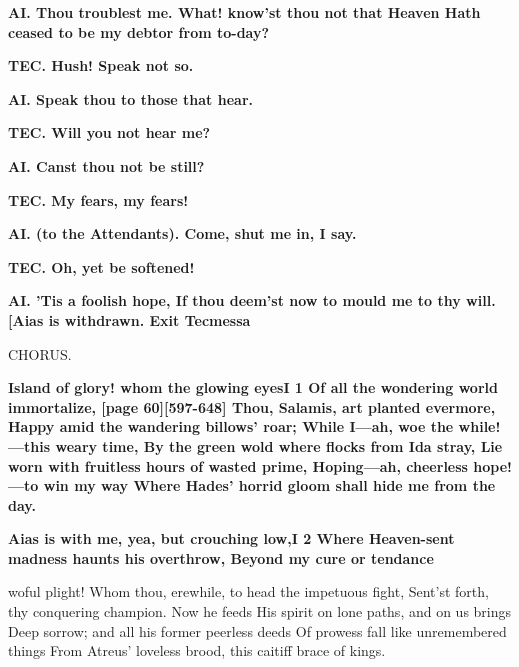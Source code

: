 \documentclass[11pt,letter]{book}
\begin{document}
\par \textbf{AI. Thou troublest me. What! know’st thou not that Heaven Hath ceased to be my debtor from to-day?}
\par 

\par \textbf{TEC. Hush! Speak not so.}
\par 

\par \textbf{AI. Speak thou to those that hear.}
\par 

\par \textbf{TEC. Will you not hear me?}
\par 

\par \textbf{AI. Canst thou not be still?}
\par 

\par \textbf{TEC. My fears, my fears!}
\par 

\par \textbf{AI. (to the Attendants). Come, shut me in, I say.}
\par 

\par \textbf{TEC. Oh, yet be softened!}
\par 

\par \textbf{AI. ’Tis a foolish hope, If thou deem’st now to mould me to thy will. [Aias is withdrawn. Exit Tecmessa}
\par 

\par  CHORUS.

\par \textbf{Island of glory! whom the glowing eyesI 1 Of all the wondering world immortalize, [page 60][597-648] Thou, Salamis, art planted evermore, Happy amid the wandering billows’ roar; While I—ah, woe the while!—this weary time, By the green wold where flocks from Ida stray, Lie worn with fruitless hours of wasted prime, Hoping—ah, cheerless hope!—to win my way Where Hades’ horrid gloom shall hide me from the day.}
\par 

\par \textbf{Aias is with me, yea, but crouching low,I 2 Where Heaven-sent madness haunts his overthrow, Beyond my cure or tendance}
\par   woful plight! Whom thou, erewhile, to head the impetuous fight, Sent’st forth, thy conquering champion. Now he feeds His spirit on lone paths, and on us brings Deep sorrow; and all his former peerless deeds Of prowess fall like unremembered things From Atreus’ loveless brood, this caitiff brace of kings.
\end{document}
